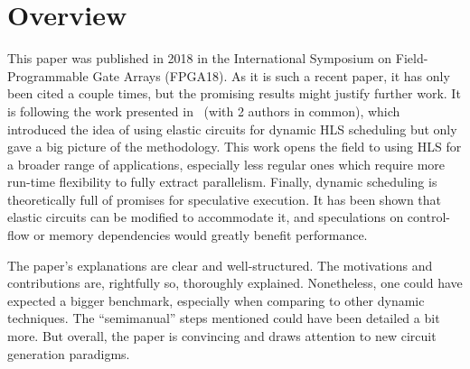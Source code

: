 \documentclass{article}
\begin{document}
\section{Overview}
This paper was published in 2018 in the International Symposium on Field-Programmable Gate Arrays (FPGA18).
As it is such a recent paper, it has only been cited a couple times, but the promising results might justify further work.
It is following the work presented in~\cite{DBLP:conf/acssc/JosipovicBI17} (with 2 authors in common), which introduced the idea of using elastic circuits for dynamic HLS scheduling but only gave a big picture of the methodology.
This work opens the field to using HLS for a broader range of applications, especially less regular ones which require more run-time flexibility to fully extract parallelism.
Finally, dynamic scheduling is theoretically full of promises for speculative execution. It has been shown that elastic circuits can be modified to accommodate it, and speculations on control-flow or memory dependencies would greatly benefit performance.

The paper's explanations are clear and well-structured. The motivations and contributions are, rightfully so, thoroughly explained.
Nonetheless, one could have expected a bigger benchmark, especially when comparing to other dynamic techniques.  The ``semimanual'' steps mentioned could have been detailed a bit more.
But overall, the paper is convincing and draws attention to new circuit generation paradigms.



\end{document}
